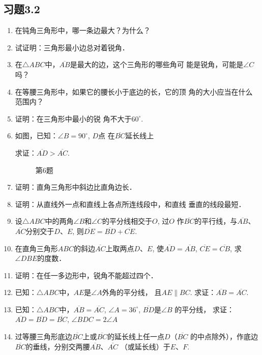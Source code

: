 \subsection*{习题3.2}
\begin{enumerate}
    \item 在钝角三角形中，哪一条边最大？为什么？
    \item 试证明：三角形最小边总对着锐角．
    \item 在$\triangle ABC$中，$\overline{AB}$是最大的边，这个三角形的哪些角可
    能是锐角，可能是$\angle C$吗？

    \item    在等腰三角形中，如果它的腰长小于底边的长，它的顶
    角的大小应当在什么范围内？
    \item 证明：在三角形中最小的锐
    角不大于$60^{\circ}$.
    \item 如图，已知：$\angle B=90^{\circ}$, $D$点
    在$\overline{BC}$延长线上

    求证：$\overline{AD}>\overline{AC}$.

\begin{figure}[htp]
    \centering
{}
    \caption*{第6题}
\end{figure}

    \item 证明：直角三角形中斜边比直角边长．
    \item 证明：从直线外一点和直线上各点所连线段中，和直线
    垂直的线段最短．
    \item 设$\triangle ABC$中的两角$\angle B$和$\angle C$的平分线相交于$O$, 过$O$
    作$\overline{BC}$的平行线，与$\overline{AB}$、$\overline{AC}$分别交于$D$、$E$, 则$\overline{DE}=
    \overline{BD}+\overline{CE}$.
    \item 在直角三角形$ABC$的斜边$\overline{AC}$上取两点$D$、$E$, 使$\overline{AD}=\overline{AB}$, $\overline{CE}=\overline{CB}$, 求$\angle DBE$的度数．
    \item 证明：在任一多边形中，锐角不能超过四个．
    \item 已知：$\triangle ABC$中，$AE$是$\angle A$外角的平分线，
    且$AE\parallel BC$. 
    求证：$\overline{AB}=\overline{AC}$.
    \item 已知：$\triangle ABC$中，$\overline{AB}=\overline{AC}$, $\angle A=36^{\circ}$, $\overline{BD}$是$\angle B$
    的平分线，
    求证：$\overline{AD}=\overline{BD}=\overline{BC}$, $\angle BDC=2\angle A$
    \item 过等腰三角形底边$\overline{BC}$上或$\overline{BC}$的延长线上任一点$D$（$\overline{BC}$
    的中点除外），作底边$\overline{BC}$的垂线，分别交两腰$\overline{AB}$、$\overline{AC}$
    （或延长线）于$E$、$F$. 


\end{enumerate}
